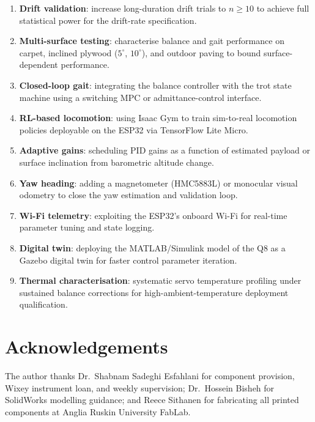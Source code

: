 \documentclass[journal]{IEEEtran}
\newcommand{\dg}{^{\circ}}
\begin{document}
\begin{enumerate}
\item \textbf{Drift validation}: increase long-duration drift
      trials to $n \geq 10$ to achieve full statistical power
      for the drift-rate specification.
\item \textbf{Multi-surface testing}: characterise balance and
      gait performance on carpet, inclined plywood ($5\dg$,
      $10\dg$), and outdoor paving to bound surface-dependent
      performance.
\item \textbf{Closed-loop gait}: integrating the balance
      controller with the trot state machine using a
      switching MPC or admittance-control interface.
\item \textbf{RL-based locomotion}: using Isaac Gym
      \cite{rudin2022learning} to train sim-to-real locomotion
      policies deployable on the ESP32 via TensorFlow Lite
      Micro.
\item \textbf{Adaptive gains}: scheduling PID gains as a
      function of estimated payload or surface inclination
      from barometric altitude change.
\item \textbf{Yaw heading}: adding a magnetometer (HMC5883L)
      or monocular visual odometry to close the yaw estimation
      and validation loop.
\item \textbf{Wi-Fi telemetry}: exploiting the ESP32's onboard
      Wi-Fi for real-time parameter tuning and state logging.
\item \textbf{Digital twin}: deploying the MATLAB/Simulink
      model of the Q8 as a Gazebo digital twin for faster
      control parameter iteration.
\item \textbf{Thermal characterisation}: systematic servo
      temperature profiling under sustained balance corrections
      for high-ambient-temperature deployment qualification.
\end{enumerate}
\section*{Acknowledgements}
The author thanks Dr.~Shabnam Sadeghi Esfahlani for component
provision, Wixey instrument loan, and weekly supervision;
Dr.~Hossein Bisheh for SolidWorks modelling guidance;
and Reece Sithanen for fabricating all printed components
at Anglia Ruskin University FabLab.
\appendices
\end{document}
